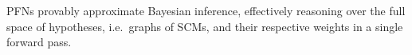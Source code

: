\documentclass{article}
\begin{document}
PFNs provably approximate Bayesian inference, effectively reasoning over the full space of hypotheses, i.e.\ graphs of SCMs, and their respective weights in a single forward pass.

\end{document}
